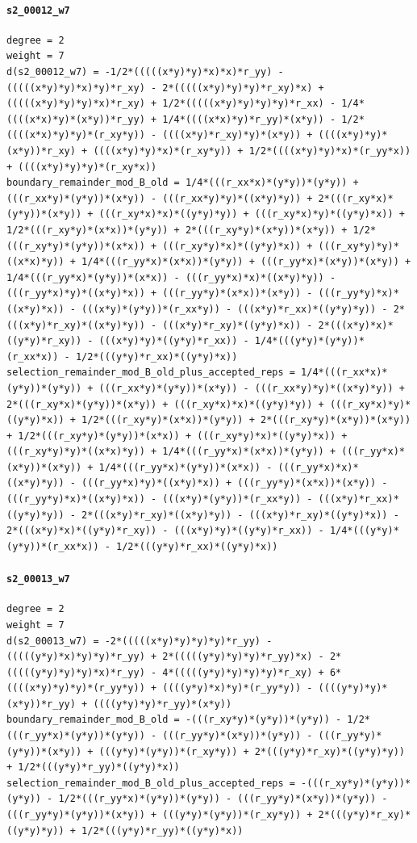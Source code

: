 \documentclass[11pt]{article}
\begin{document}
\paragraph{\texttt{s2\_00012\_w7}}
\begin{verbatim}
degree = 2
weight = 7
d(s2_00012_w7) = -1/2*(((((x*y)*y)*x)*x)*r_yy) - (((((x*y)*y)*x)*y)*r_xy) - 2*(((((x*y)*y)*y)*r_xy)*x) + (((((x*y)*y)*y)*x)*r_xy) + 1/2*(((((x*y)*y)*y)*y)*r_xx) - 1/4*((((x*x)*y)*(x*y))*r_yy) + 1/4*((((x*x)*y)*r_yy)*(x*y)) - 1/2*((((x*x)*y)*y)*(r_xy*y)) - ((((x*y)*r_xy)*y)*(x*y)) + ((((x*y)*y)*(x*y))*r_xy) + ((((x*y)*y)*x)*(r_xy*y)) + 1/2*((((x*y)*y)*x)*(r_yy*x)) + ((((x*y)*y)*y)*(r_xy*x))
boundary_remainder_mod_B_old = 1/4*(((r_xx*x)*(y*y))*(y*y)) + (((r_xx*y)*(y*y))*(x*y)) - (((r_xx*y)*y)*((x*y)*y)) + 2*(((r_xy*x)*(y*y))*(x*y)) + (((r_xy*x)*x)*((y*y)*y)) + (((r_xy*x)*y)*((y*y)*x)) + 1/2*(((r_xy*y)*(x*x))*(y*y)) + 2*(((r_xy*y)*(x*y))*(x*y)) + 1/2*(((r_xy*y)*(y*y))*(x*x)) + (((r_xy*y)*x)*((y*y)*x)) + (((r_xy*y)*y)*((x*x)*y)) + 1/4*(((r_yy*x)*(x*x))*(y*y)) + (((r_yy*x)*(x*y))*(x*y)) + 1/4*(((r_yy*x)*(y*y))*(x*x)) - (((r_yy*x)*x)*((x*y)*y)) - (((r_yy*x)*y)*((x*y)*x)) + (((r_yy*y)*(x*x))*(x*y)) - (((r_yy*y)*x)*((x*y)*x)) - (((x*y)*(y*y))*(r_xx*y)) - (((x*y)*r_xx)*((y*y)*y)) - 2*(((x*y)*r_xy)*((x*y)*y)) - (((x*y)*r_xy)*((y*y)*x)) - 2*(((x*y)*x)*((y*y)*r_xy)) - (((x*y)*y)*((y*y)*r_xx)) - 1/4*(((y*y)*(y*y))*(r_xx*x)) - 1/2*(((y*y)*r_xx)*((y*y)*x))
selection_remainder_mod_B_old_plus_accepted_reps = 1/4*(((r_xx*x)*(y*y))*(y*y)) + (((r_xx*y)*(y*y))*(x*y)) - (((r_xx*y)*y)*((x*y)*y)) + 2*(((r_xy*x)*(y*y))*(x*y)) + (((r_xy*x)*x)*((y*y)*y)) + (((r_xy*x)*y)*((y*y)*x)) + 1/2*(((r_xy*y)*(x*x))*(y*y)) + 2*(((r_xy*y)*(x*y))*(x*y)) + 1/2*(((r_xy*y)*(y*y))*(x*x)) + (((r_xy*y)*x)*((y*y)*x)) + (((r_xy*y)*y)*((x*x)*y)) + 1/4*(((r_yy*x)*(x*x))*(y*y)) + (((r_yy*x)*(x*y))*(x*y)) + 1/4*(((r_yy*x)*(y*y))*(x*x)) - (((r_yy*x)*x)*((x*y)*y)) - (((r_yy*x)*y)*((x*y)*x)) + (((r_yy*y)*(x*x))*(x*y)) - (((r_yy*y)*x)*((x*y)*x)) - (((x*y)*(y*y))*(r_xx*y)) - (((x*y)*r_xx)*((y*y)*y)) - 2*(((x*y)*r_xy)*((x*y)*y)) - (((x*y)*r_xy)*((y*y)*x)) - 2*(((x*y)*x)*((y*y)*r_xy)) - (((x*y)*y)*((y*y)*r_xx)) - 1/4*(((y*y)*(y*y))*(r_xx*x)) - 1/2*(((y*y)*r_xx)*((y*y)*x))
\end{verbatim}
\paragraph{\texttt{s2\_00013\_w7}}
\begin{verbatim}
degree = 2
weight = 7
d(s2_00013_w7) = -2*(((((x*y)*y)*y)*y)*r_yy) - (((((y*y)*x)*y)*y)*r_yy) + 2*(((((y*y)*y)*y)*r_yy)*x) - 2*(((((y*y)*y)*y)*x)*r_yy) - 4*(((((y*y)*y)*y)*y)*r_xy) + 6*((((x*y)*y)*y)*(r_yy*y)) + ((((y*y)*x)*y)*(r_yy*y)) - ((((y*y)*y)*(x*y))*r_yy) + ((((y*y)*y)*r_yy)*(x*y))
boundary_remainder_mod_B_old = -(((r_xy*y)*(y*y))*(y*y)) - 1/2*(((r_yy*x)*(y*y))*(y*y)) - (((r_yy*y)*(x*y))*(y*y)) - (((r_yy*y)*(y*y))*(x*y)) + (((y*y)*(y*y))*(r_xy*y)) + 2*(((y*y)*r_xy)*((y*y)*y)) + 1/2*(((y*y)*r_yy)*((y*y)*x))
selection_remainder_mod_B_old_plus_accepted_reps = -(((r_xy*y)*(y*y))*(y*y)) - 1/2*(((r_yy*x)*(y*y))*(y*y)) - (((r_yy*y)*(x*y))*(y*y)) - (((r_yy*y)*(y*y))*(x*y)) + (((y*y)*(y*y))*(r_xy*y)) + 2*(((y*y)*r_xy)*((y*y)*y)) + 1/2*(((y*y)*r_yy)*((y*y)*x))
\end{verbatim}
\end{document}

